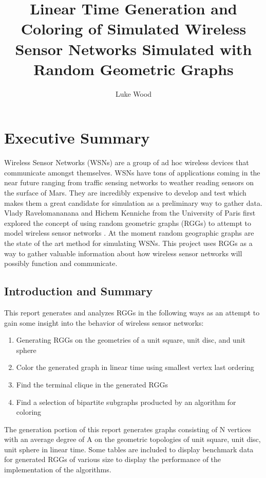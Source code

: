 \documentclass{article}
\begin{document}
  \title{Linear Time Generation and Coloring of Simulated Wireless Sensor Networks Simulated with Random Geometric Graphs}
  \author{Luke Wood}
  \maketitle

  \section{Executive Summary}
	Wireless Sensor Networks (WSNs) are a group of ad hoc wireless devices that communicate amongst themselves.
  WSNs have tons of applications coming in the near future ranging from traffic sensing networks to weather reading sensors on the surface of Mars\cite{mahjoub2010employing}.
	They are incredibly expensive to develop and test which makes them a great candidate for simulation as a preliminary way to gather data.
	Vlady Ravelomananana and Hichem Kenniche from the University of Paris first explored the concept of using random geometric graphs (RGGs) to attempt to model wireless sensor networks \cite{kenniche2010random}.
  At the moment random geographic graphs are the state of the art method for simulating WSNs.
	This project uses RGGs as a way to gather valuable information about how wireless sensor networks will possibly function and communicate.

  \subsection{Introduction and Summary}
	This report generates and analyzes RGGs in the following ways as an attempt to gain some insight into the behavior of wireless sensor networks:
	\begin{enumerate}
		\item Generating RGGs on the geometries of a unit square, unit disc, and unit sphere
		\item Color the generated graph in linear time using smallest vertex last ordering\cite{matula1983smallest}
		\item Find the terminal clique in the generated RGGs
		\item Find a selection of bipartite subgraphs producted by an algorithm for coloring
	\end{enumerate}
	The generation portion of this report generates graphs consisting of N vertices with an average degree of A on the geometric topologies of unit square, unit disc, unit sphere in linear time.
	Some tables are included to display benchmark data for generated RGGs of various size to display the performance of the implementation of the algorithms.
\end{document}
